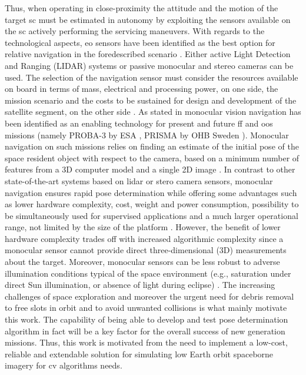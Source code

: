 Thus, when operating in close-proximity the attitude and the motion of the target \acrshort{sc} must be estimated in autonomy by exploiting the sensors available on the \acrshort{sc} actively performing the servicing maneuvers.
With regards to the technological aspects, \acrfull{eo} sensors have been identified as the best option for relative navigation in the foredescribed scenario \cite{Opromolla2017} \cite{pesciolino}.
Either active Light Detection and Ranging (LIDAR) systems or passive monocular and stereo cameras can be used. The selection of the navigation sensor must consider the resources available on board in terms of mass, electrical and processing power, on one side, the mission scenario and the costs to be sustained for design and development of the satellite segment, on the other side \cite{clerc2012astrium} \cite{pesciolino}.
As stated in \cite{Sharma2016} monocular vision navigation has been identified as an enabling technology for present and future \acrshort{ff} and \acrshort{oos} missions (namely PROBA-3 by ESA \cite{Casti2019}, PRISMA by OHB Sweden \cite{2013Damico}).
Monocular navigation on such missions relies on finding an estimate of the initial pose of the space resident object with respect to the camera, based on a minimum number of features from a 3D computer model and a single 2D image \cite{Sharma2016}.
In contrast to other state-of-the-art systems based on \acrfull{lidar} or stero camera sensors, monocular navigation ensures rapid pose determination while offering some advantages such as lower hardware complexity, cost, weight and power consumption, possibility to be simultaneously used for supervised applications and a much larger operational range, not limited by the size of the platform \cite{Sharma2018} \cite{2016Ventura} \cite{pesciolino}.
However, the benefit of lower hardware complexity trades off with increased algorithmic complexity since a monocular sensor cannot provide direct three-dimensional (3D) measurements about the target.
Moreover, monocular sensors can be less robust to adverse illumination conditions typical of the space environment \cite{Volpe2017} (e.g., saturation under direct Sun illumination, or absence of light during eclipse) \cite{pesciolino}.
The increasing challenges of space exploration and moreover the urgent need for debris removal to free slots in orbit and to avoid unwanted collisions is what mainly motivate this work.
The capability of being able to develop and test pose determination algorithm in fact will be a key factor for the overall success of new generation missions. Thus, this work is motivated from the need to implement a low-cost, reliable and extendable solution for simulating low Earth orbit spaceborne imagery for \acrfull{cv} algorithms needs.

